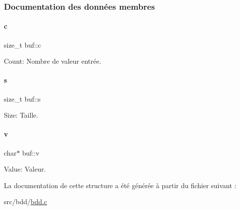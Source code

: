 \subsubsection{Documentation des données membres}
\mbox{\label{structbuf_a37cf76bb775bf17b3e7566e0611428e6}} 
\paragraph{\texorpdfstring{c}{c}}
{\footnotesize\ttfamily size\+\_\+t buf\+::c}



Count\+: Nombre de valeur entrée. 

\mbox{\label{structbuf_aae0f7f61347b29fa0088cbf7d952b14c}} 
\paragraph{\texorpdfstring{s}{s}}
{\footnotesize\ttfamily size\+\_\+t buf\+::s}



Size\+: Taille. 

\mbox{\label{structbuf_a0690d33ca270683cb07fd9a1b9f4dd68}} 
\paragraph{\texorpdfstring{v}{v}}
{\footnotesize\ttfamily char$\ast$ buf\+::v}



Value\+: Valeur. 



La documentation de cette structure a été générée à partir du fichier suivant \+:\begin{DoxyCompactItemize}
\item 
src/bdd/\hyperlink{bdd_8c}{bdd.\+c}\end{DoxyCompactItemize}
